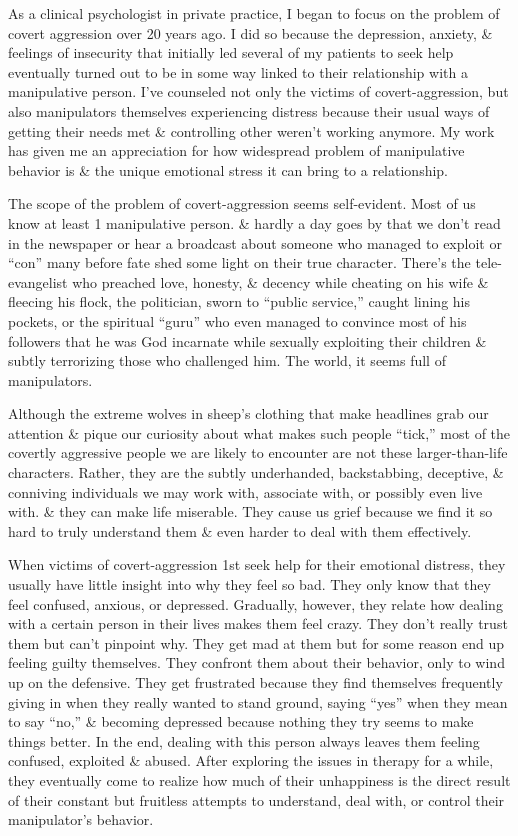 \documentclass{article}
\numberwithin{equation}{section}
\begin{document}
As a clinical psychologist in private practice, I began to focus on the problem of covert aggression over 20 years ago. I did so because the depression, anxiety, \& feelings of insecurity that initially led several of my patients to seek help eventually turned out to be in some way linked to their relationship with a manipulative person. I've counseled not only the victims of covert-aggression, but also manipulators themselves experiencing distress because their usual ways of getting their needs met \& controlling other weren't working anymore. My work has given me an appreciation for how widespread problem of manipulative behavior is \& the unique emotional stress it can bring to a relationship.

The scope of the problem of covert-aggression seems self-evident. Most of us know at least 1 manipulative person. \& hardly a day goes by that we don't read in the newspaper or hear a broadcast about someone who managed to exploit or ``con'' many before fate shed some light on their true character. There's the tele-evangelist who preached love, honesty, \& decency while cheating on his wife \& fleecing his flock, the politician, sworn to ``public service,'' caught lining his pockets, or the spiritual ``guru'' who even managed to convince most of his followers that he was God incarnate while sexually exploiting their children \& subtly terrorizing those who challenged him. The world, it seems full of manipulators.

Although the extreme wolves in sheep's clothing that make headlines grab our attention \& pique our curiosity about what makes such people ``tick,'' most of the covertly aggressive people we are likely to encounter are not these larger-than-life characters. Rather, they are the subtly underhanded, backstabbing, deceptive, \& conniving individuals we may work with, associate with, or possibly even live with. \& they can make life miserable. They cause us grief because we find it so hard to truly understand them \& even harder to deal with them effectively.

When victims of covert-aggression 1st seek help for their emotional distress, they usually have little insight into why they feel so bad. They only know that they feel confused, anxious, or depressed. Gradually, however, they relate how dealing with a certain person in their lives makes them feel crazy. They don't really trust them but can't pinpoint why. They get mad at them but for some reason end up feeling guilty themselves. They confront them about their behavior, only to wind up on the defensive. They get frustrated because they find themselves frequently giving in when they really wanted to stand ground, saying ``yes'' when they mean to say ``no,'' \& becoming depressed because nothing they try seems to make things better. In the end, dealing with this person always leaves them feeling confused, exploited \& abused. After exploring the issues in therapy for a while, they eventually come to realize how much of their unhappiness is the direct result of their constant but fruitless attempts to understand, deal with, or control their manipulator's behavior.
\end{document}
